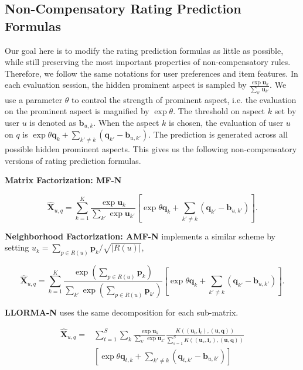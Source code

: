 \documentclass[letterpaper]{article} %
\newcommand{\Rating}{\mathbf{X}}
\begin{document}
 
\subsection{Non-Compensatory Rating Prediction Formulas}
Our goal here is to modify the rating prediction formulas as little as possible, while still preserving the most important properties of non-compensatory rules. Therefore, we follow the same notations for user preferences and item features. In each evaluation session, the hidden prominent aspect is sampled by $\frac{\exp \mathbf{u}_k}{\sum_{k'} \mathbf{u}_{k'}} $. We use a parameter $\theta$ to control the strength of prominent aspect, i.e. the evaluation on the prominent aspect is magnified by  $\exp \theta$. The threshold on aspect $k$ set by user $u$ is denoted as $\mathbf{b}_{u,k}$. When the aspect $k$ is chosen, the evaluation of user $u$ on $q$ is $\exp\theta \mathbf{q}_k  + \sum_{k'\neq k} (\mathbf{q}_{k'}-\mathbf{b}_{u,k'})$. The prediction is generated across all possible hidden prominent aspects. This gives us the following non-compensatory versions of rating prediction formulas.

\textbf{Matrix Factorization: MF-N} 

\begin{equation}\label{equ:MF-N}
 \hat{\mathbf{X}}_{u,q}=\sum_{k=1}^{K} \frac{\exp \mathbf{u}_k}{\sum_{k'} \exp \mathbf{u}_{k'}} [ \exp\theta \mathbf{q}_k  + \sum_{k'\neq k} (\mathbf{q}_{k'}-\mathbf{b}_{u,k'}) ].
\end{equation}


\textbf{Neighborhood Factorization: AMF-N} implements a similar scheme by setting $u_k =\sum_{p \in R(u)} \mathbf{p}_k/\sqrt{|R(u)|} $, 

\begin{equation}\label{equ:AMF-N}
 \hat{\mathbf{X}}_{u,q}=\sum_{k=1}^{K} \frac{\exp (\sum_{p \in R(u)} \mathbf{p}_k )}{\sum_{k'} \exp  (\sum_{p \in R(u)} \mathbf{p}_{k'} ) } [ \exp\theta \mathbf{q}_k  + \sum_{k'\neq k} (\mathbf{q}_{k'}-\mathbf{b}_{u,k'}) ].
\end{equation}

\textbf{LLORMA-N} uses the same decomposition for each sub-matrix.  

\begin{eqnarray}\label{equ:LLORMA-N}
\hat{\Rating}_{u,q} = & \sum_{t=1}^{S} \sum_k  \frac{\exp \mathbf{u}_k}{\sum_{k'} \exp \mathbf{u}_{k'}}  \frac{K((\mathbf{u}_t,\mathbf{i}_t),(\mathbf{u},\mathbf{q}))}{\sum_{s=1}^{S} K((\mathbf{u}_s,\mathbf{i}_s),(\mathbf{u},\mathbf{q}))} \\\nonumber
& [ \exp\theta \mathbf{q}_{t,k}  + \sum_{k'\neq k} (\mathbf{q}_{t,k'}-\mathbf{b}_{u,k'}) ]
\end{eqnarray}
\end{document}
